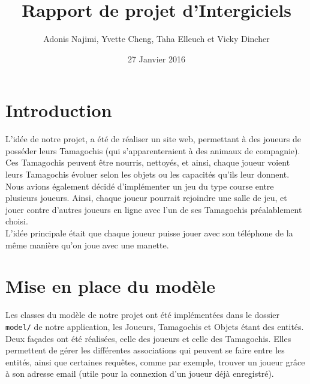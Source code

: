 \documentclass[11pt,a4paper]{report}
\author{Adonis Najimi, Yvette Cheng, Taha Elleuch et Vicky Dincher}
\title{Rapport de projet d'Intergiciels}
\date{27 Janvier 2016}
\begin{document}
\maketitle
\newpage
 
\section*{Introduction}

L'idée de notre projet, a été de réaliser un site web, permettant à des joueurs de posséder leurs Tamagochis (qui s'apparenteraient à des animaux de compagnie). Ces Tamagochis peuvent être nourris, nettoyés, et ainsi, chaque joueur voient leurs Tamagochis évoluer selon les objets ou les capacités qu'ils leur donnent. \\
Nous avions également décidé d'implémenter un jeu du type course entre plusieurs joueurs. Ainsi, chaque joueur pourrait rejoindre une salle de jeu, et jouer contre d'autres joueurs en ligne avec l'un de ses Tamagochis préalablement choisi. \\
L'idée principale était que chaque joueur puisse jouer avec son téléphone de la même manière qu'on joue avec une manette.

\section{Mise en place du modèle}

Les classes du modèle de notre projet ont été implémentées dans le dossier \texttt{model/} de notre application, les Joueurs, Tamagochis et Objets étant des entités. \\
Deux façades ont été réalisées, celle des joueurs et celle des Tamagochis. Elles permettent de gérer les différentes associations qui peuvent se faire entre les entités, ainsi que certaines requêtes, comme par exemple, trouver un joueur grâce à son adresse email (utile pour la connexion d'un joueur déjà enregistré).
\end{document}
